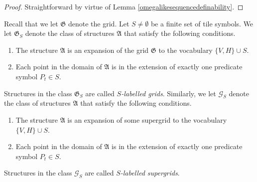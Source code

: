 \documentclass{LMCS}
\theoremstyle{plain}
\newcommand{\mf}{\mathfrak}
\begin{document}
%
%
%
\begin{proof}
%
Straightforward by virtue of Lemma \ref{omegalikesequencedefinability}.
%
\end{proof}
%
%
%
%
%
%
%
%
%

%
Recall that we let $\mf{G}$ denote the grid. Let $S\not=\emptyset$
%
be a finite set of tile symbols. We let $\mf{G}_S$ denote the class of structures $\mf{A}$ that satisfy the following conditions.
\begin{enumerate}
\item The structure $\mf{A}$ is an expansion of the grid $\mf{G}$ to the vocabulary $\{V,H\}\cup S$.
\item Each point in the domain of $\mf{A}$ is in the extension of exactly one predicate symbol $P_t\in S$.
\end{enumerate} 
Structures in the class $\mf{G}_S$ are called \emph{$S$-labelled grids}.
%
%
Similarly, we let $\mathcal{G}_S$ denote the class of structures $\mf{A}$ that satisfy the following conditions.
\begin{enumerate}
\item The structure $\mf{A}$ is an expansion of some supergrid to the vocabulary $\{V,H\}\cup S$.
\item Each point in the domain of $\mf{A}$ is in the extension of exactly one predicate symbol $P_t\in S$.
\end{enumerate} 
Structures in the class $\mathcal{G}_S$ are called
\emph{$S$-labelled supergrids}.
\end{document}

